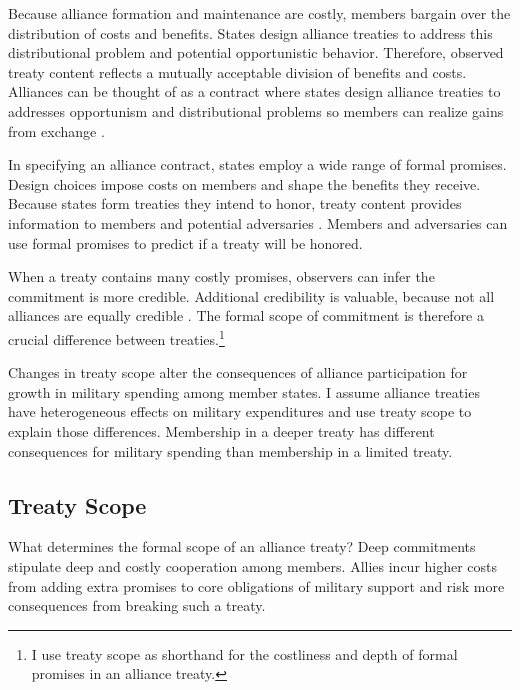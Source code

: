 \documentclass[12pt]{article}
\begin{document}
Because alliance formation and maintenance are costly, members bargain over the distribution of costs and benefits.
States design alliance treaties to address this distributional problem and potential opportunistic behavior. 
Therefore, observed treaty content reflects a mutually acceptable division of benefits and costs. 
Alliances can be thought of as a contract where states design alliance treaties to addresses opportunism and distributional problems \citep{Williamson1985, Koremenosetal2001} so members can realize gains from exchange \citep{Lake1996, Bensonetal2014}.


In specifying an alliance contract, states employ a wide range of formal promises. 
Design choices impose costs on members and shape the benefits they receive.
Because states form treaties they intend to honor, treaty content provides information to members and potential adversaries \citep{Leeds2003}. 
Members and adversaries can use formal promises to predict if a treaty will be honored.


When a treaty contains many costly promises, observers can infer the commitment is more credible. 
Additional credibility is valuable, because not all alliances are equally credible \citep{Benson2012}. 
The formal scope of commitment is therefore a crucial difference between treaties.\footnote{I use treaty scope as shorthand for the costliness and depth of formal promises in an alliance treaty.} 


Changes in treaty scope alter the consequences of alliance participation for growth in military spending among member states. 
I assume alliance treaties have heterogeneous effects on military expenditures and use treaty scope to explain those differences. 
Membership in a deeper treaty has different consequences for military spending than membership in a limited treaty. 


\subsection{Treaty Scope}


What determines the formal scope of an alliance treaty? 
Deep commitments stipulate deep and costly cooperation among members.
Allies incur higher costs from adding extra promises to core obligations of military support and risk more consequences from breaking such a treaty. 
\end{document}
